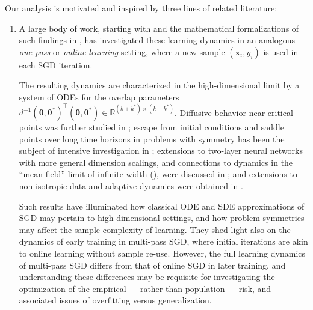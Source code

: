 \documentclass[11pt,letterpaper,reqno]{amsart}
\theoremstyle{definition}
\def\R{\mathbb{R}}
\def\x{\mathbf{x}}
\def\btheta{\boldsymbol{\theta}}
\begin{document}
Our analysis is motivated and inspired by three lines of related literature:

\begin{enumerate}[1.]
\item A large body of work, starting with
\cite{saad1995dynamics,saad1995exact,riegler1995line,biehl1995learning} and the mathematical
formalizations of such findings in \cite{wang2019solvable,goldt2019dynamics},
has investigated these learning dynamics in an
analogous \emph{one-pass} or \emph{online learning} setting, where a new
sample $(\x_i,y_i)$ is used in each SGD iteration.

The resulting dynamics are characterized in the high-dimensional limit by a system of ODEs for the overlap parameters
$d^{-1}(\btheta,\btheta^*)^\top (\btheta,\btheta^*) \in \R^{(k+k^*) \times
(k+k^*)}$. Diffusive behavior near critical points was further studied in
\cite{ben2022high}; escape from initial conditions and saddle points
over long time horizons in problems with symmetry has been the subject of
intensive investigation in
\cite{ge2015escaping,fang2019sharp,arous2021online,barak2022hidden,tan2023online,abbe2023sgd,damian2023smoothing,damian2025generative,joshi2025learning};
extensions to two-layer neural networks with more general dimension scalings, and connections to dynamics in the ``mean-field'' limit of infinite width
(\cite{mei2018mean,chizat2018global,rotskoff2022trainability}), were discussed
in \cite{veiga2022phase,arnaboldi2023high}; and extensions to non-isotropic
data and adaptive dynamics were obtained
in \cite{collins2024hitting,collins2024high}.

Such results have illuminated how classical ODE and SDE
approximations of SGD may pertain to high-dimensional settings, and
how problem symmetries may affect the sample complexity of learning. They
shed light also on the dynamics of early training in multi-pass SGD, where
initial iterations are akin to online learning without sample re-use.
However, the full learning dynamics of multi-pass SGD 
differs from that of online SGD in later training, and understanding these
differences may be requisite for investigating the optimization of the empirical
--- rather than population --- risk, and associated issues of overfitting
versus generalization.\\


\end{enumerate}
\end{document}
